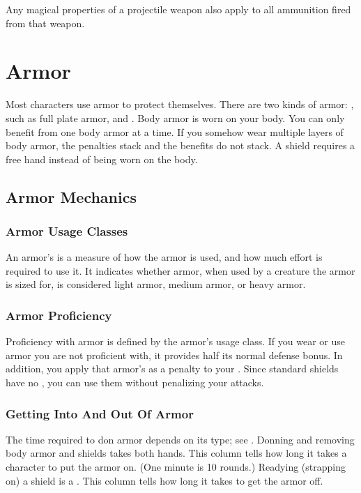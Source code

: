      Any magical properties of a projectile weapon also apply to all ammunition fired from that weapon.

    

    

\newpage
\section{Armor}\label{Armor}

    Most characters use armor to protect themselves. There are two kinds of armor: , such as full plate armor, and .
    Body armor is worn on your body.
    You can only benefit from one body armor at a time.
    If you somehow wear multiple layers of body armor, the penalties stack and the benefits do not stack.
    A shield requires a free hand instead of being worn on the body.

    \subsection{Armor Mechanics}

        \subsubsection{Armor Usage Classes}\label{Armor Usage Classes}
            An armor's  is a measure of how the armor is used, and how much effort is required to use it.
            It indicates whether armor, when used by a creature the armor is sized for, is considered light armor, medium armor, or heavy armor.

        \subsubsection{Armor Proficiency}\label{Armor Proficiency}
            Proficiency with armor is defined by the armor's usage class.
            If you wear or use armor you are not proficient with, it provides half its normal defense bonus.
            In addition, you apply that armor's  as a penalty to your .
            Since standard shields have no , you can use them without penalizing your attacks.

        \subsubsection{Getting Into And Out Of Armor}
            The time required to don armor depends on its type; see . Donning and removing body armor and shields takes both hands.
             This column tells how long it takes a character to put the armor on. (One minute is 10 rounds.) Readying (strapping on) a shield is a .
             This column tells how long it takes to get the armor off.

